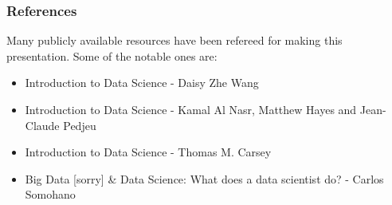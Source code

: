 \begin{frame}\frametitle{References}
Many publicly available resources have been refereed for making this presentation. Some of the notable ones are:
\small
\begin{itemize}
\item Introduction to Data Science - Daisy Zhe Wang
\item Introduction to Data Science - Kamal Al Nasr, Matthew Hayes and Jean-Claude Pedjeu
\item Introduction to Data Science - Thomas M. Carsey
\item Big Data [sorry] \& Data Science: What does a data scientist do? - Carlos Somohano
\end{itemize}
\end{frame}

